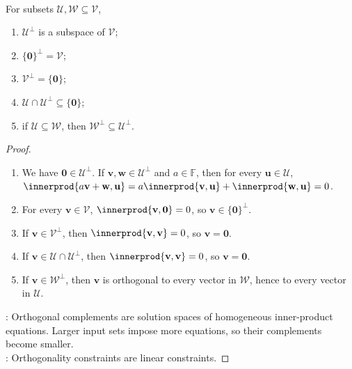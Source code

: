 \begin{proposition} \label{prop:basic-properties-orthogonal-complement} \\
For subsets $\mathcal{U},\mathcal{W}\subseteq\mathcal{V}$,
\begin{enumerate}[label=(\roman*)]
\setlength{\itemsep}{0pt}
\item $\mathcal{U}^{\perp}$ is a subspace of $\mathcal{V}$;
\item $\{\mathbf{0}\}^{\perp}=\mathcal{V}$;
\item $\mathcal{V}^{\perp}=\{\mathbf{0}\}$;
\item $\mathcal{U}\cap\mathcal{U}^{\perp}\subseteq\{\mathbf{0}\}$;
\item if $\mathcal{U}\subseteq\mathcal{W}$, then $\mathcal{W}^{\perp}\subseteq\mathcal{U}^{\perp}$.
\end{enumerate}
\begin{proof}
\begin{enumerate}[label=(\roman*)]
\setlength{\itemsep}{0pt}
\item We have $\mathbf{0}\in\mathcal{U}^{\perp}$. If $\mathbf{v},\mathbf{w}\in\mathcal{U}^{\perp}$ and $a\in\mathbb{F}$, then for every $\mathbf{u}\in\mathcal{U}$, $\innerprod{a\mathbf{v}+\mathbf{w},\mathbf{u}}=a\innerprod{\mathbf{v},\mathbf{u}}+\innerprod{\mathbf{w},\mathbf{u}}=0$.
\item For every $\mathbf{v}\in\mathcal{V}$, $\innerprod{\mathbf{v},\mathbf{0}}=0$, so $\mathbf{v}\in\{\mathbf{0}\}^{\perp}$.
\item If $\mathbf{v}\in\mathcal{V}^{\perp}$, then $\innerprod{\mathbf{v},\mathbf{v}}=0$, so $\mathbf{v}=\mathbf{0}$.
\item If $\mathbf{v}\in\mathcal{U}\cap\mathcal{U}^{\perp}$, then $\innerprod{\mathbf{v},\mathbf{v}}=0$, so $\mathbf{v}=\mathbf{0}$.
\item If $\mathbf{v}\in\mathcal{W}^{\perp}$, then $\mathbf{v}$ is orthogonal to every vector in $\mathcal{W}$, hence to every vector in $\mathcal{U}$.
\end{enumerate}
: Orthogonal complements are solution spaces of homogeneous inner-product equations. Larger input sets impose more equations, so their complements become smaller.\\
: Orthogonality constraints are linear constraints.
\end{proof}
\end{proposition}

